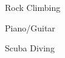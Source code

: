 
\begin{cventries}

  \cventry
    {Rock Climbing} %
    {} %
    {} %
    {} %
    {}

  \cventry
    {Piano/Guitar} %
    {} %
    {} %
    {} %
    {}

  \cventry
    {Scuba Diving} %
    {} %
    {} %
    {} %
    {}

\end{cventries}

